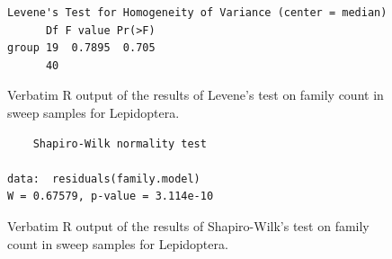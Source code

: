 \documentclass[10pt,letterpaper,twocolumn]{article}
\begin{document}
\begin{figure}[h]
	\lstset{numbers=left}
	\lstset{xleftmargin=5mm,framexleftmargin=5mm}
	\begin{lstlisting}
Levene's Test for Homogeneity of Variance (center = median)
      Df F value Pr(>F)
group 19  0.7895  0.705
      40               
	\end{lstlisting}
	\caption{Verbatim R output of the results of Levene's test on family count in sweep samples for Lepidoptera.}
	\label{fig:sweep_lepidoptera_family_levene}
	\smallskip
	\nointerlineskip
	\hrulefill
\end{figure}

\begin{figure}[h]
	\lstset{numbers=left}
	\lstset{xleftmargin=5mm,framexleftmargin=5mm}
	\begin{lstlisting}
	Shapiro-Wilk normality test

data:  residuals(family.model)
W = 0.67579, p-value = 3.114e-10
	\end{lstlisting}
	\caption{Verbatim R output of the results of Shapiro-Wilk's test on family count in sweep samples for Lepidoptera.}
	\label{fig:sweep_lepidoptera_family_shapiro}
	\smallskip
	\nointerlineskip
	\hrulefill
\end{figure}
\end{document}
